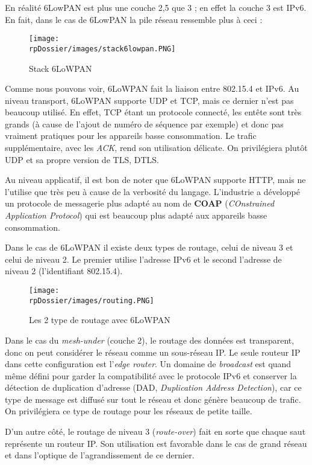 En réalité 6LowPAN est plus une couche 2,5 que 3 ; en effet la couche 3 est IPv6. En fait, dans le cas de 6LowPAN la pile réseau ressemble plus à ceci :

\begin{figure}[H]
\centering
\texttt{[image: \\rpDossier/images/stack6lowpan.PNG]}
\caption{Stack 6LoWPAN}
\label{stack6lowpan}
\end{figure}

Comme nous pouvons voir, 6LoWPAN fait la liaison entre 802.15.4 et IPv6. Au niveau transport, 6LoWPAN supporte UDP et TCP, mais ce dernier n'est pas beaucoup utilisé. En effet, TCP étant un protocole connecté, les entête sont très grands (à cause de l'ajout de numéro de séquence par exemple) et donc pas vraiment pratiques pour les appareils basse consommation. Le trafic supplémentaire, avec les \textit{ACK}, rend son utilisation délicate. On privilégiera plutôt UDP et sa propre version de TLS, DTLS. 

Au niveau applicatif, il est bon de noter que 6LoWPAN supporte HTTP, mais ne l'utilise que très peu à cause de la verbosité du langage. L'industrie a développé un protocole de messagerie plus adapté au nom de \textbf{COAP} (\textit{COnstrained Application Protocol}) qui est beaucoup plus adapté aux appareils basse consommation.



Dans le cas de 6LoWPAN il existe deux types de routage, celui de niveau 3 et celui de niveau 2. Le premier utilise l'adresse IPv6 et le second l'adresse de niveau 2 (l'identifiant 802.15.4).

\begin{figure}[H]
\centering
\texttt{[image: \\rpDossier/images/routing.PNG]}
\caption{Les 2 type de routage avec 6LoWPAN}
\label{routing}
\end{figure}

Dans le cas du \textit{mesh-under} (couche 2), le routage des données est transparent, donc on peut considérer le réseau comme un sous-réseau IP. Le seule routeur IP dans cette configuration est l'\textit{edge router}. Un domaine de \textit{broadcast} est quand même défini pour garder la compatibilité avec le protocole IPv6 et  conserver la détection de duplication d'adresse (DAD, \textit{Duplication Address Detection}), car ce type de message est diffusé sur tout le réseau et donc génère beaucoup de trafic. On privilégiera ce type de routage pour les réseaux de petite taille.

D'un autre côté, le routage de niveau 3 (\textit{route-over}) fait en sorte que chaque saut représente un routeur IP. Son utilisation est favorable dans le cas de grand réseau et dans l'optique de l'agrandissement de ce dernier. 

